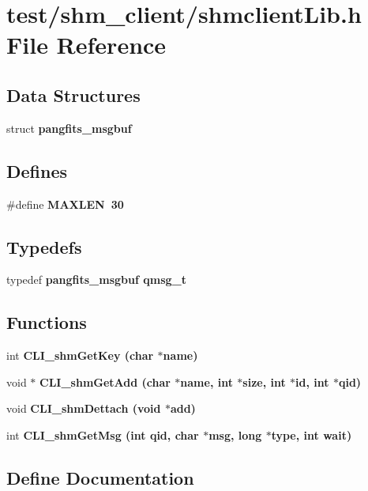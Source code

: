 \section{test/shm\_\-client/shmclient\-Lib.h File Reference}
\label{shm__client_2shmclientLib_8h}
\subsection*{Data Structures}
\begin{CompactItemize}
\item 
struct \bf{pangfits\_\-msgbuf}
\end{CompactItemize}
\subsection*{Defines}
\begin{CompactItemize}
\item 
\#define \bf{MAXLEN}~30
\end{CompactItemize}
\subsection*{Typedefs}
\begin{CompactItemize}
\item 
typedef \bf{pangfits\_\-msgbuf} \bf{qmsg\_\-t}
\end{CompactItemize}
\subsection*{Functions}
\begin{CompactItemize}
\item 
int \bf{CLI\_\-shm\-Get\-Key} (char $\ast$name)
\item 
void $\ast$ \bf{CLI\_\-shm\-Get\-Add} (char $\ast$name, int $\ast$size, int $\ast$id, int $\ast$qid)
\item 
void \bf{CLI\_\-shm\-Dettach} (void $\ast$add)
\item 
int \bf{CLI\_\-shm\-Get\-Msg} (int qid, char $\ast$msg, long $\ast$type, int wait)
\end{CompactItemize}


\subsection{Define Documentation}
